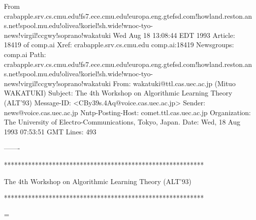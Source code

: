 From crabapple.srv.cs.cmu.edu!fs7.ece.cmu.edu!europa.eng.gtefsd.com!howland.reston.ans.net!spool.mu.edu!olivea!koriel!sh.wide!wnoc-tyo-news!virgil!ccgwy!soprano!wakatuki Wed Aug 18 13:08:44 EDT 1993
Article: 18419 of comp.ai
Xref: crabapple.srv.cs.cmu.edu comp.ai:18419
Newsgroups: comp.ai
Path: crabapple.srv.cs.cmu.edu!fs7.ece.cmu.edu!europa.eng.gtefsd.com!howland.reston.ans.net!spool.mu.edu!olivea!koriel!sh.wide!wnoc-tyo-news!virgil!ccgwy!soprano!wakatuki
From: wakatuki@ttl.cas.uec.ac.jp (Mituo WAKATUKI)
Subject: The 4th Workshop on Algorithmic Learning Theory (ALT'93)
Message-ID: <CBy39s.4Aq@voice.cas.uec.ac.jp>
Sender: news@voice.cas.uec.ac.jp
Nntp-Posting-Host: comet.ttl.cas.uec.ac.jp
Organization: The University of Electro-Communications, Tokyo, Japan.
Date: Wed, 18 Aug 1993 07:53:51 GMT
Lines: 493

-------


           **********************************************************

            The 4th Workshop on Algorithmic Learning Theory (ALT'93)

           **********************************************************



\textheight=27cm
\textwidth=18cm
\topmargin=-2.5cm
\oddsidemargin=-12mm
\evensidemargin=\oddsidemargin
\columnsep=5mm

\newenvironment{session}[3]{\vspace{2mm}\begin{tabular}{l@{\hspace{2mm}}ll}#1 & \bf #2 & \bf #3\end{tabular}\par
\vspace{2mm}\begin{list}{}{\setlength{\leftmargin}{10mm}\setlength{\itemsep}{2mm}\setlength{\topsep}{-2mm}}}{\end{list}\vspace{2mm}}
\newcommand{\talk}[2]{\baselineskip=6pt
\item[] {\scriptsize\bf #1} \\[3pt]
{\em #2}}
\newcommand{\talkA}[1]{\baselineskip=6pt
\item[] {\scriptsize\bf #1}}
\newcommand{\chair}[1]{\vspace{-1.5mm}\begin{flushright}\scriptsize Chair : {#1}\end{flushright}\vspace{-.5mm}}
\newcommand{\BREAK}[2]{\vspace{2mm}\begin{tabular}{ll}#1 & \bf #2\end{tabular}\par\vspace{1mm}}



